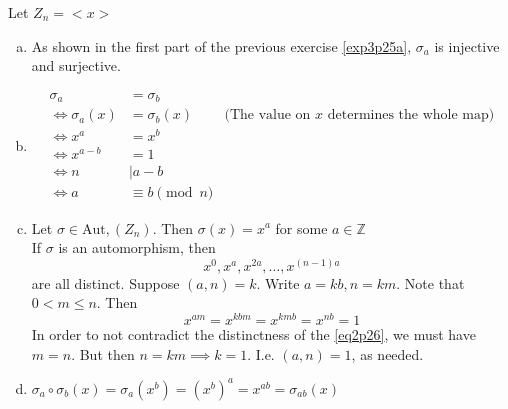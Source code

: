 \documentclass{article}
\newcommand{\ints}{\mathbb{Z}}
\newcommand{\comp}{ \circ }
\newcommand{\Aut}{ \textrm{Aut}, }
\newcommand{\divides}{\big\vert}
\newcommand{\cyclic}[1]{<#1>}
\begin{document}
\subsubsection{}\label{ex3p26}
Let $Z_n = \cyclic{x}$
\begin{enumerate}[(a)]
\item As shown in the first part of the previous exercise \ref{exp3p25a}, $\sigma_a$ is injective and surjective.
\item 
\begin{align*}
\sigma_a &= \sigma_b\\
\iff \sigma_a(x) &= \sigma_b(x) & \mbox{(The value on $x$ determines the whole map)}\\
\iff x^a &= x^b\\
\iff x^{a-b} &= 1\\
\iff n &\divides a-b\\
\iff a &\equiv b \pmod{n}
\end{align*}
\item
Let $\sigma \in \Aut(Z_n)$. Then $\sigma(x) = x^a$ for some $a \in \ints$\\
If $\sigma$ is an automorphism, then
\begin{equation}
x^0, x^a, x^{2a},\ldots, x^{(n-1)a} \label{eq2p26}
\end{equation}
are all distinct. Suppose $(a,n)=k$. Write $a=kb,n=km$. Note that $0<m\leq n$. Then\\
\begin{equation}
x^{am} = x^{kbm} = x^{kmb} = x^{nb} = 1
\end{equation}
In order to not contradict the distinctness of the \ref{eq2p26}, we must have $m=n$. But then $n=km \implies k=1$. I.e. $(a,n)=1$, as needed.
\item
$\sigma_a\comp\sigma_b(x) = \sigma_a(x^b) = (x^b)^a = x^{ab} = \sigma_{ab}(x)$
\end{enumerate}
\end{document}
